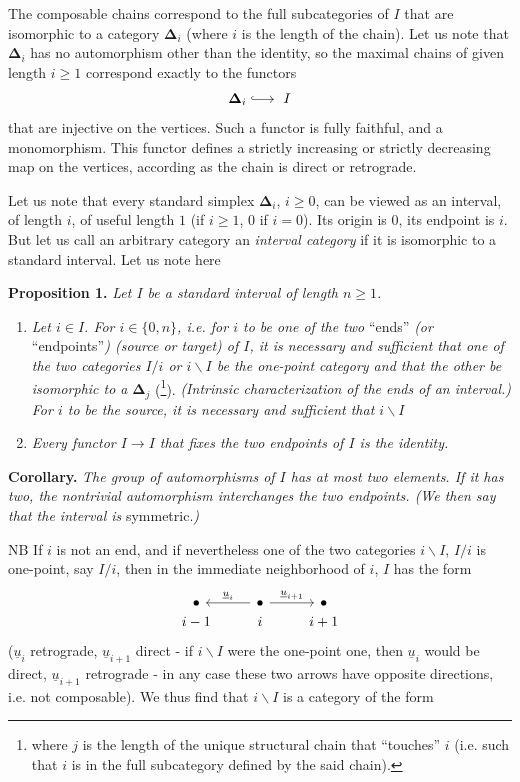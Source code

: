 \documentclass[11pt]{article}
\newcommand{\msp}[1]{\marginpar{\footnotesize [#1]}}
\newcommand{\bDelta}{\boldsymbol{\Delta}}
\begin{document}
The composable chains correspond to the full subcategories of $I$ that are isomorphic to a category $\bDelta_i$ (where $i$ is the length of the chain). Let us note that $\bDelta_i$ has no automorphism other than the identity, so the maximal chains of given length $i\geq 1$ correspond exactly to the functors
\[
\bDelta_i\lhook\joinrel\longrightarrow\ I
\]
that are injective on the vertices. Such a functor is fully faithful, and a monomorphism. This functor defines a strictly increasing or strictly decreasing map on
\msp{page 5}
the vertices, according as the chain is direct or retrograde.

Let us note that every standard simplex $\bDelta_i$, $i\geq 0$, can be viewed as an interval, of length $i$, of useful length $1$ (if $i\geq 1$, $0$ if $i=0$). Its origin is $0$, its endpoint is $i$. But let us call an arbitrary category an \textit{interval category} if it is isomorphic to a standard interval. Let us note here

\textbf{Proposition 1.} \textit{Let $I$ be a standard interval of length $n\geq 1$.}

\begin{enumerate}
\item[\textit{a)}] \textit{Let $i\in I$. For $i\in\{0,n\}$, i.e. for $i$ to be one of the two} ``ends'' \textit{(or} ``endpoints''\textit{) (source or target) of $I$, it is necessary and sufficient that one of the two categories $I/i$ or $i\backslash I$ be the one-point category and that the other be isomorphic to a} $\bDelta_j$ (\footnote{where $j$ is the length of the unique structural chain that ``touches'' $i$ (i.e. such that $i$ is in the full subcategory defined by the said chain).}). \textit{(Intrinsic characterization of the ends of an interval.) For $i$ to be the source, it is necessary and sufficient that $i\backslash I$}
\item[\textit{b)}] \textit{Every functor $I\longrightarrow I$ that fixes the two endpoints of $I$ is the identity.}
\end{enumerate}

\textbf{Corollary.} \textit{The group of automorphisms of $I$ has at most two elements. If it has two, the nontrivial automorphism interchanges the two endpoints. (We then say that the interval is} symmetric.\textit{)}

\msp{page 6}
NB If $i$ is not an end, and if nevertheless one of the two categories $i\backslash I$, $I/i$ is one-point, say $I/i$, then in the immediate neighborhood of $i$, $I$ has the form
\[
\begin{tikzcd}[row sep=0pt]
\bullet & \bullet \arrow[l, "\underline{u}_i"'] \arrow[r, "\underline{u}_{i+1}"] & \bullet \\
i-1 & i & i+1
\end{tikzcd}
\]
($\underline{u}_i$ retrograde, $\underline{u}_{i+1}$ direct - if $i\backslash I$ were the one-point one, then $\underline{u}_i$ would be direct, $\underline{u}_{i+1}$ retrograde - in any case these two arrows have opposite directions, i.e. not composable). We thus find that $i\backslash I$ is a category of the form
\end{document}
